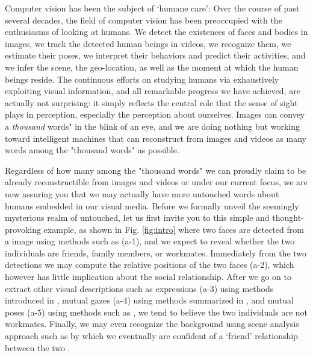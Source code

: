 \pagestyle{plain} 

\begin{center}
{\Large{\bf \mytitle}}
\end{center}
\vspace{-0.1in}

\label{sec:intro}

Computer vision has been the subject of `humane care': Over the course of past several decades, the field of computer vision has been preoccupied with the enthusiasms of looking at humans. We detect the existences of faces and bodies in images, we track the detected human beings in videos, we recognize them, we estimate their poses, we interpret their behaviors and predict their activities, and we infer the scene, the geo-location, as well as the moment at which the human beings reside. The continuous efforts on studying humans via exhaustively exploiting visual information, and all remarkable progress we have achieved, are actually not surprising: it simply reflects the central role that the sense of sight plays in perception, especially the perception about ourselves. Images can convey a \emph{thousand} words" in the blink of an eye, and we are doing nothing but working toward intelligent machines that can reconstruct from images and videos as many words among the "thousand words" as possible.

Regardless of how many among the "thousand words" we can proudly claim to be already reconstructible from images and videos or under our current focus, we are now assuring you that we may actually have more untouched words about humans embedded in our visual media. Before we formally unveil the seemingly mysterious realm of untouched, let us first invite you to this simple and thought-provoking example, as shown in Fig. \ref{fig:intro} where two faces are detected from a image using methods such as \cite{ViolaJones} (a-1), and we expect to reveal whether the two individuals are friends, family members, or workmates. Immediately from the two detections we may compute the relative positions of the two faces (a-2), which however has little implication about the social relationship. After we go on to extract other visual descriptions such as expressions (a-3) using methods introduced in \cite{delaTorre:expression},  mutual gazes (a-4) using methods summarized in \cite{Hanson}, and mutual poses (a-5) using methods such as \cite{poselet}, we tend to believe the two individuals are not workmates. Finally, we may even recognize the background using scene analysis approach such as \cite{scene} by which we eventually are confident of a `friend' relationship between the two . 

